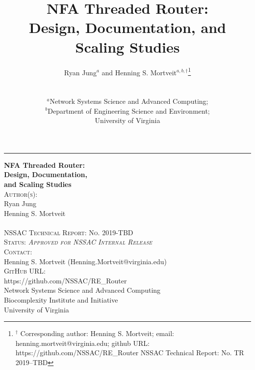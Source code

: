 \documentclass[english]{article}
\theoremstyle{remark}
\numberwithin{equation}{section}
\begin{document}
\begin{titlepage}
\raggedleft\raggedbottom
\rule{1pt}{\textheight} %
\hspace{0.05\textwidth} %
\parbox[b]{0.75\textwidth}{ %
  {\huge\bfseries NFA Threaded Router:\\[1ex]
    Design, Documentation, \\[1ex] and Scaling Studies}\\[9\baselineskip]
{{\Large\textsc{Author(s):}\\[1ex]
\phantom{\quad}Ryan Jung\\[1ex]
\phantom{\quad}Henning S. Mortveit\\[1ex]
}}\\[4\baselineskip]
{{\Large\textsc{NSSAC Technical Report: No. 2019-TBD}}}\\[2\baselineskip]
{{\Large\textsc{Status: \emph{Approved for NSSAC Internal Release}}}}\\[2\baselineskip]
{{\Large\textsc{Contact:}\\[1ex]\phantom{\quad}Henning S. Mortveit (Henning.Mortveit@virginia.edu)}}\\[2\baselineskip]
{{\Large\textsc{GitHub URL:}\\[1ex]\phantom{\quad}https://github.com/NSSAC/RE\_Router}}\\[7\baselineskip]
\vspace*{\fill}
\vfill
Network Systems Science and Advanced Computing\\
Biocomplexity Institute and Initiative\\
University of Virginia
}
\end{titlepage}


\title{NFA Threaded Router: \\Design, Documentation, and Scaling Studies}
\author{
Ryan Jung${}^a$ and
Henning S. Mortveit${}^{a,b,\dag}$\footnote{$^\dag$
  Corresponding author: Henning S. Mortveit;\hfil\break
  email: henning.mortveit@virginia.edu;\hfil\break
  github URL: https://github.com/NSSAC/RE\_Router\hfil\break
  NSSAC Technical Report: No. TR 2019--TBD
}\\
\\[1ex]\\
${}^a$Network Systems Science and Advanced Computing;\\
${}^b$Department of Engineering Science and Environment;\\
University of Virginia
}
\maketitle
\end{document}
